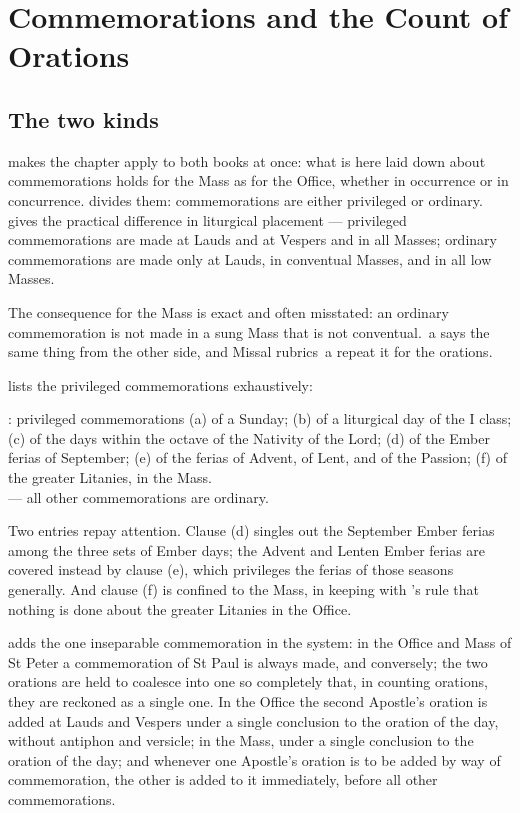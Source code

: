\section{Commemorations and the Count of Orations}
\label{sec:commemorations}

\subsection{The two kinds}

 makes the chapter apply to both books at once: what is here laid down about
commemorations holds for the Mass as for the Office, whether in occurrence or in concurrence.
 divides them: commemorations are either privileged or ordinary.  gives the
practical difference in liturgical placement — privileged commemorations are made at Lauds and
at Vespers and in all Masses; ordinary commemorations are made only at Lauds, in conventual
Masses, and in all low Masses.

The consequence for the Mass is exact and often misstated: an ordinary commemoration is not made
in a sung Mass that is not conventual. \,a says the same thing from the other side, and
Missal rubrics \,a repeat it for the orations.

 lists the privileged commemorations exhaustively:

\begin{studybox}{: privileged commemorations}
(a) of a Sunday; (b) of a liturgical day of the I class; (c) of the days within the octave of
the Nativity of the Lord; (d) of the Ember ferias of September; (e) of the ferias of Advent, of
Lent, and of the Passion; (f) of the greater Litanies, in the Mass.\\[0.35em]
 — all other commemorations
are ordinary.
\end{studybox}

Two entries repay attention. Clause (d) singles out the September Ember ferias among the three
sets of Ember days; the Advent and Lenten Ember ferias are covered instead by clause (e), which
privileges the ferias of those seasons generally. And clause (f) is confined to the Mass, in
keeping with 's rule that nothing is done about the greater Litanies in the Office.

 adds the one inseparable commemoration in the system: in the Office and Mass of St Peter
a commemoration of St Paul is always made, and conversely; the two orations are held to coalesce
into one so completely that, in counting orations, they are reckoned as a single one. In the
Office the second Apostle's oration is added at Lauds and Vespers under a single conclusion to
the oration of the day, without antiphon and versicle; in the Mass, under a single conclusion to
the oration of the day; and whenever one Apostle's oration is to be added by way of
commemoration, the other is added to it immediately, before all other commemorations.

